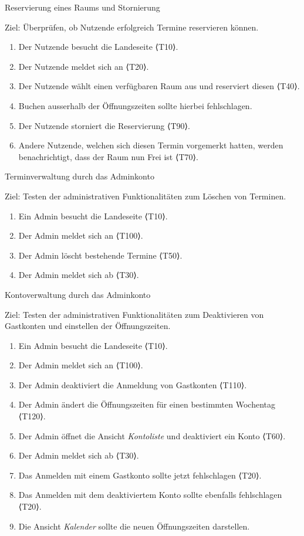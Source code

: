 \begin{scenario}{20}{Reservierung eines Raums und Stornierung}
  \item[Ziel:] Überprüfen, ob Nutzende erfolgreich Termine reservieren können.
  \begin{enumerate}
    \item Der Nutzende besucht die Landeseite ⟨T10⟩.
    \item Der Nutzende meldet sich an ⟨T20⟩.
    \item Der Nutzende wählt einen verfügbaren Raum aus und reserviert diesen ⟨T40⟩.
    \item Buchen ausserhalb der Öffnungszeiten sollte hierbei fehlschlagen.
    \item Der Nutzende storniert die Reservierung ⟨T90⟩.
    \item Andere Nutzende, welchen sich diesen Termin vorgemerkt hatten, werden benachrichtigt, dass der Raum nun Frei ist ⟨T70⟩.
  \end{enumerate}
\end{scenario}

\begin{scenario}{30}{Terminverwaltung durch das Adminkonto}
  \item[Ziel:] Testen der administrativen Funktionalitäten zum Löschen von Terminen.
  \begin{enumerate}
    \item Ein Admin besucht die Landeseite ⟨T10⟩.
    \item Der Admin meldet sich an ⟨T100⟩.
    \item Der Admin löscht bestehende Termine ⟨T50⟩.
    \item Der Admin meldet sich ab ⟨T30⟩.
  \end{enumerate}
\end{scenario}

\begin{scenario}{40}{Kontoverwaltung durch das Adminkonto}
  \item[Ziel:] Testen der administrativen Funktionalitäten zum Deaktivieren von Gastkonten und einstellen der Öffnungszeiten.
  \begin{enumerate}
    \item Ein Admin besucht die Landeseite ⟨T10⟩.
    \item Der Admin meldet sich an ⟨T100⟩.
    \item Der Admin deaktiviert die Anmeldung von Gastkonten ⟨T110⟩.
    \item Der Admin ändert die Öffnungszeiten für einen bestimmten Wochentag ⟨T120⟩.
    \item Der Admin öffnet die Ansicht \textit{Kontoliste} und deaktiviert ein Konto ⟨T60⟩.
    \item Der Admin meldet sich ab ⟨T30⟩.
    \item Das Anmelden mit einem Gastkonto sollte jetzt fehlschlagen ⟨T20⟩.
    \item Das Anmelden mit dem deaktiviertem Konto sollte ebenfalls fehlschlagen ⟨T20⟩.
    \item Die Ansicht \textit{Kalender} sollte die neuen Öffnungszeiten darstellen.
  \end{enumerate}
\end{scenario}

